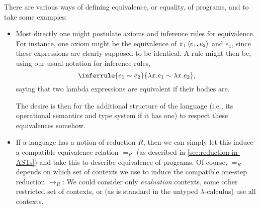 There are various ways of defining equivalence, or equality, of programs, and to take some examples:
%
\begin{itemize}
    \item {}%
    Most directly one might postulate axioms and inference rules for equivalence. For instance, one axiom might be the equivalence of $\expProjl{\expPair{e_1}{e_2}}$ and $e_1$, since these expressions are clearly supposed to be identical. A rule might then be, using our usual notation for inference rules,
    \begin{equation*}
        \inferrule{
            e_1 \sim e_2
        }{
            \expLam{x}{e_1} \sim \expLam{x}{e_2}
        },
    \end{equation*}
    saying that two lambda expressions are equivalent if their bodies are.

    The desire is then for the additional structure of the language (i.e., its operational semantics and type system if it has one) to respect these equivalences somehow.

    \item If a language has a notion of reduction $R$, then we can simply let this induce a compatible equivalence relation $=_R$ (as described in \cref{sec:reduction-in-ASTs}) and take this to describe equivalence of programs. Of course, $=_R$ depends on which set of contexts we use to induce the compatible one-step reduction $\to_R$: We could consider only \emph{evaluation} contexts, some other restricted set of contexts, or (as is standard in the untyped $\lambda$-calculus) use all contexts.


\end{itemize}
